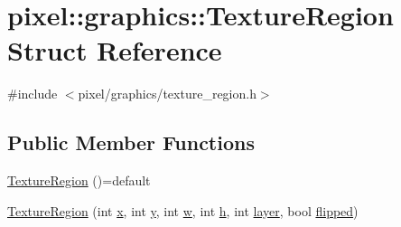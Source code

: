 \hypertarget{structpixel_1_1graphics_1_1_texture_region}{}\section{pixel\+:\+:graphics\+:\+:Texture\+Region Struct Reference}
\label{structpixel_1_1graphics_1_1_texture_region}


{\ttfamily \#include $<$pixel/graphics/texture\+\_\+region.\+h$>$}

\subsection*{Public Member Functions}
\begin{DoxyCompactItemize}
\item 
\hyperlink{structpixel_1_1graphics_1_1_texture_region_ab35637b13bc025dcc548a2ed5982ee19}{Texture\+Region} ()=default
\item 
\hyperlink{structpixel_1_1graphics_1_1_texture_region_acbd50d361f37be881ba6e445d6337a64}{Texture\+Region} (int \hyperlink{structpixel_1_1graphics_1_1_texture_region_a5e5ae4be563334f295368f2487e264c5}{x}, int \hyperlink{structpixel_1_1graphics_1_1_texture_region_adc95100decbaac0ccd8ee4df885b822a}{y}, int \hyperlink{structpixel_1_1graphics_1_1_texture_region_a3808878a4220a8a7a8a590ee8e089310}{w}, int \hyperlink{structpixel_1_1graphics_1_1_texture_region_ac8da7a932775f6ab00f956d00b4599ac}{h}, int \hyperlink{structpixel_1_1graphics_1_1_texture_region_ac17cc15ef453654e9a60bda0501ce2fb}{layer}, bool \hyperlink{structpixel_1_1graphics_1_1_texture_region_abbd4cd9bdb8d5fd6502d80d55dfec2e8}{flipped})
\end{DoxyCompactItemize}
